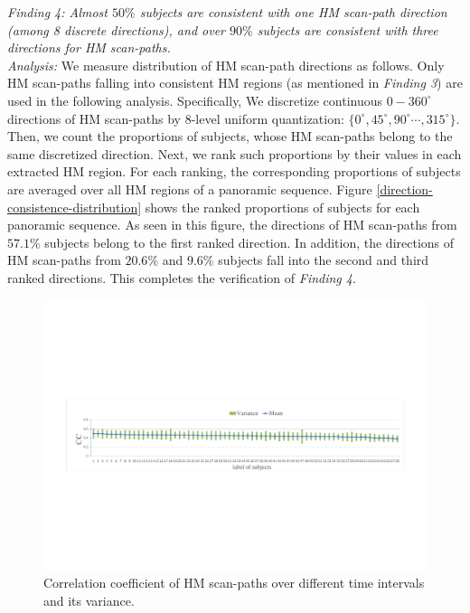 \documentclass[10pt,journal,compsoc]{IEEEtran}
\begin{document}
\emph{Finding 4: Almost $50\%$ subjects are consistent with one HM scan-path direction (among 8 discrete directions), and over $90\%$ subjects are consistent with three directions for HM scan-paths. }
\\ \textit{Analysis:} We measure distribution of HM scan-path directions as follows. Only HM scan-paths falling into consistent HM regions (as mentioned in \textit{Finding 3}) are used in the following analysis. Specifically, We discretize continuous $0-360^{\circ}$ directions of HM scan-paths by 8-level uniform quantization: $\{0^{\circ}, 45^{\circ}, 90^{\circ} \cdots, 315^{\circ} \}$.
Then, we count the proportions of subjects, whose HM scan-paths belong to the same discretized direction.
Next, we rank such proportions by their values in each extracted HM region. For each ranking, the corresponding proportions of subjects are averaged over all HM regions of a panoramic sequence.
Figure \ref{direction-consistence-distribution} shows the ranked proportions of subjects for each panoramic sequence.
As seen in this figure, the directions of HM scan-paths from $57.1\%$ subjects belong to the first ranked direction.
In addition,  the directions of HM scan-paths from $20.6\%$ and $9.6\%$  subjects fall into the second and third ranked directions.
This completes the verification of \textit{Finding 4}.

\begin{figure}
	\begin{center}
		\centerline{\includegraphics[width=.9\columnwidth]{figures/database/consi_on_time}}%
		\caption{\footnotesize{Correlation coefficient of HM scan-paths over different time intervals and its variance. }}
		\label{consi_on_time}
	\end{center}
\end{figure}
\end{document}
